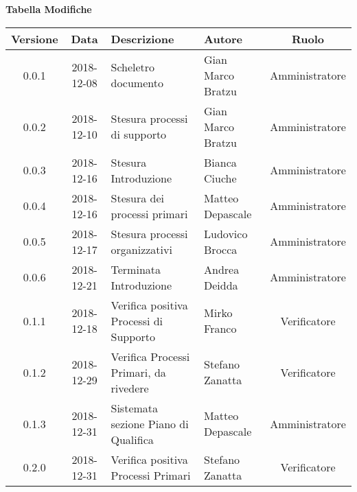 \begin{center}
	\textbf{Tabella Modifiche}
	\end{center}
	\begin{center}
		\begin{tabularx}{\textwidth}{|c|c|X|X|c|}
			\hline
			\textbf{Versione} & \textbf{Data} & \textbf{Descrizione} & \textbf{Autore} & \textbf{Ruolo} \\
			\hline
			0.0.1 & 2018-12-08 & Scheletro documento  & Gian Marco Bratzu & Amministratore\\
			\hline
			0.0.2 & 2018-12-10 & Stesura processi di supporto & Gian Marco Bratzu & Amministratore\\	
			\hline
			0.0.3 & 2018-12-16 & Stesura Introduzione & Bianca Ciuche & Amministratore\\
			\hline
			0.0.4 & 2018-12-16 & Stesura dei processi primari & Matteo Depascale & Amministratore\\
			\hline
			0.0.5 & 2018-12-17 & Stesura processi organizzativi & Ludovico Brocca & Amministratore\\
			\hline
			0.0.6 & 2018-12-21 & Terminata Introduzione & Andrea Deidda & Amministratore\\
			\hline
			0.1.1 & 2018-12-18 & Verifica positiva Processi di Supporto & Mirko Franco & Verificatore\\
			\hline
			0.1.2 & 2018-12-29 & Verifica Processi Primari, da rivedere & Stefano Zanatta & Verificatore\\
			\hline
			0.1.3 & 2018-12-31 & Sistemata sezione Piano di Qualifica & Matteo Depascale & Amministratore\\
			\hline
			0.2.0 & 2018-12-31 & Verifica positiva Processi Primari & Stefano Zanatta & Verificatore\\
			\hline
		\end{tabularx}
	\end{center}

\newpage